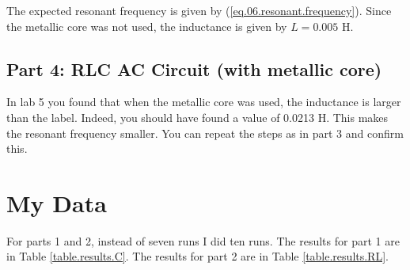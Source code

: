 The expected resonant frequency is given by (\ref{eq.06.resonant.frequency}). Since the metallic core was not used, the inductance is given by $L = 0.005$ H.
\subsection{Part 4: RLC AC Circuit (with metallic core)}
In lab 5 you found that when the metallic core was used, the inductance is larger than the label. Indeed, you should have found a value of 0.0213 H. This makes the resonant frequency smaller. You can repeat the steps as in part 3 and confirm this.
\section{My Data}
For parts 1 and 2, instead of seven runs I did ten runs. The results for part 1 are in Table \ref{table.results.C}. The results for part 2 are in Table \ref{table.results.RL}.

